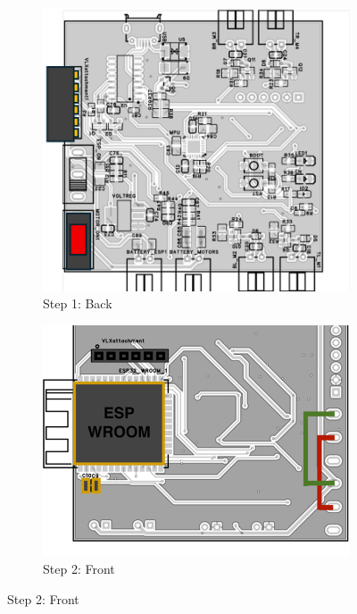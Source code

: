 \begin{manualblock}
\begin{figure}[H]
  \centering
  \begin{subfigure}[b]{0.48\linewidth}
    \centering
    \includegraphics[width=\linewidth]{img/manual/solder5.png}
    \caption{Step 1: Back}
  \end{subfigure}
  \hfill
  \begin{subfigure}[b]{0.48\linewidth}
    \centering
    \includegraphics[width=\linewidth]{img/manual/solder6.png}
    \caption{Step 2: Front}
  \end{subfigure}
\end{figure}



\end{manualblock}
